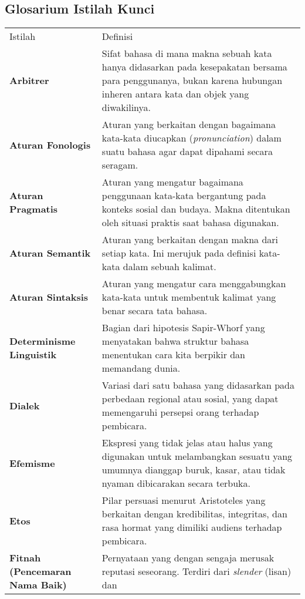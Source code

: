 \documentclass[
  letterpaper,
  DIV=11,
  numbers=noendperiod]{scrreprt}
\begin{document}
\subsection{Glosarium Istilah Kunci}\label{glosarium-istilah-kunci-3}

\begin{longtable}[]{@{}
  >{\raggedright\arraybackslash}p{}
  >{\raggedright\arraybackslash}p{}@{}}
\toprule\noalign{}
\endhead
\bottomrule\noalign{}
\endlastfoot
Istilah & Definisi \\
\textbf{Arbitrer} & Sifat bahasa di mana makna sebuah kata hanya
didasarkan pada kesepakatan bersama para penggunanya, bukan karena
hubungan inheren antara kata dan objek yang diwakilinya. \\
\textbf{Aturan Fonologis} & Aturan yang berkaitan dengan bagaimana
kata-kata diucapkan (\emph{pronunciation}) dalam suatu bahasa agar dapat
dipahami secara seragam. \\
\textbf{Aturan Pragmatis} & Aturan yang mengatur bagaimana penggunaan
kata-kata bergantung pada konteks sosial dan budaya. Makna ditentukan
oleh situasi praktis saat bahasa digunakan. \\
\textbf{Aturan Semantik} & Aturan yang berkaitan dengan makna dari
setiap kata. Ini merujuk pada definisi kata-kata dalam sebuah
kalimat. \\
\textbf{Aturan Sintaksis} & Aturan yang mengatur cara menggabungkan
kata-kata untuk membentuk kalimat yang benar secara tata bahasa. \\
\textbf{Determinisme Linguistik} & Bagian dari hipotesis Sapir-Whorf
yang menyatakan bahwa struktur bahasa menentukan cara kita berpikir dan
memandang dunia. \\
\textbf{Dialek} & Variasi dari satu bahasa yang didasarkan pada
perbedaan regional atau sosial, yang dapat memengaruhi persepsi orang
terhadap pembicara. \\
\textbf{Efemisme} & Ekspresi yang tidak jelas atau halus yang digunakan
untuk melambangkan sesuatu yang umumnya dianggap buruk, kasar, atau
tidak nyaman dibicarakan secara terbuka. \\
\textbf{Etos} & Pilar persuasi menurut Aristoteles yang berkaitan dengan
kredibilitas, integritas, dan rasa hormat yang dimiliki audiens terhadap
pembicara. \\
\textbf{Fitnah (Pencemaran Nama Baik)} & Pernyataan yang dengan sengaja
merusak reputasi seseorang. Terdiri dari \emph{slender} (lisan) dan

\end{longtable}
\end{document}
